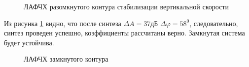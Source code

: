 \begin{figure}[H]
    \caption{ЛАФЧХ разомкнутого контура стабилизации вертикальной скорости}
    \label{fig:Вертикальная скорость раз qMAX}
\end{figure}

Из рисунка \ref{fig:Вертикальная скорость раз qMAX} видно, что после синтеза $\Delta A = 37 $дБ $\Delta \varphi = 58^0$, следовательно, синтез проведен успешно, коэффициенты рассчитаны верно. Замкнутая система будет устойчива.  

\begin{figure}[H]
    \caption{ЛАФЧХ замкнутого контура }
    \label{fig:Вертикальная скорость зам qMAX}
\end{figure}


